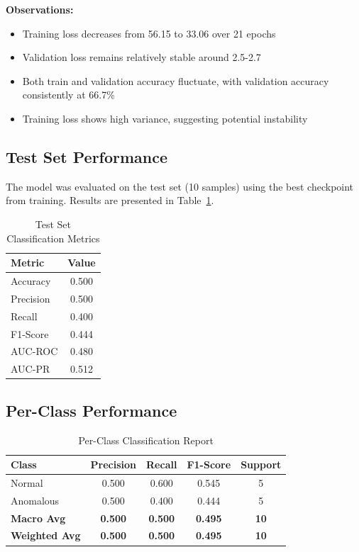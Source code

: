 \documentclass[11pt,a4paper]{article}
\begin{document}
\textbf{Observations:}
\begin{itemize}
    \item Training loss decreases from 56.15 to 33.06 over 21 epochs
    \item Validation loss remains relatively stable around 2.5-2.7
    \item Both train and validation accuracy fluctuate, with validation accuracy consistently at 66.7\%
    \item Training loss shows high variance, suggesting potential instability
\end{itemize}

\subsection{Test Set Performance}

The model was evaluated on the test set (10 samples) using the best checkpoint from training. Results are presented in Table~\ref{tab:test_results}.

\begin{table}[H]
\centering
\caption{Test Set Classification Metrics}
\label{tab:test_results}
\begin{tabular}{lc}
\toprule
\textbf{Metric} & \textbf{Value} \\
\midrule
Accuracy & 0.500 \\
Precision & 0.500 \\
Recall & 0.400 \\
F1-Score & 0.444 \\
AUC-ROC & 0.480 \\
AUC-PR & 0.512 \\
\bottomrule
\end{tabular}
\end{table}

\subsection{Per-Class Performance}

\begin{table}[H]
\centering
\caption{Per-Class Classification Report}
\begin{tabular}{lcccc}
\toprule
\textbf{Class} & \textbf{Precision} & \textbf{Recall} & \textbf{F1-Score} & \textbf{Support} \\
\midrule
Normal & 0.500 & 0.600 & 0.545 & 5 \\
Anomalous & 0.500 & 0.400 & 0.444 & 5 \\
\midrule
\textbf{Macro Avg} & \textbf{0.500} & \textbf{0.500} & \textbf{0.495} & \textbf{10} \\
\textbf{Weighted Avg} & \textbf{0.500} & \textbf{0.500} & \textbf{0.495} & \textbf{10} \\
\bottomrule
\end{tabular}
\end{table}
\end{document}
